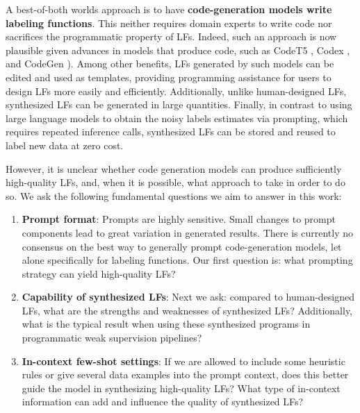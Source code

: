 A best-of-both worlds approach is to have \textbf{code-generation models write labeling functions}. This neither requires domain experts to write code nor sacrifices the programmatic property of LFs. 
%
Indeed, such an approach is now plausible given advances in models that produce code, such as CodeT5 \cite{wang2021codet5}, Codex \cite{chen2021evaluating}, and CodeGen \cite{Nijkamp2022CG}). 
%
Among other benefits, LFs generated by such models can be edited and used as templates, providing programming assistance for users to design LFs more easily and efficiently. 
%
Additionally, unlike human-designed LFs, synthesized LFs can be generated in large quantities. 
%
Finally, in contrast to using large language models to obtain the noisy labels estimates via prompting, which requires repeated inference calls, synthesized LFs can be stored and reused to label new data at zero cost. %


However, it is unclear whether code generation models can produce sufficiently high-quality LFs, and, when it is possible, what approach to take in order to do so. We ask the following fundamental questions we aim to answer in this work:
\begin{enumerate}
    \item \textbf{Prompt format}: Prompts are highly sensitive. Small changes to prompt components lead to great variation in generated results. There is currently no consensus on the best way to generally prompt code-generation models, let alone specifically for labeling functions. Our first question is: what prompting strategy can yield high-quality LFs?
    \item \textbf{Capability of synthesized LFs}: Next we ask: compared to human-designed LFs, what are the strengths and weaknesses of synthesized LFs? Additionally, what is the typical result when using these synthesized programs in programmatic weak supervision pipelines?
    \item \textbf{In-context few-shot settings}: If we are allowed to include some heuristic rules or give several data examples into the prompt context, does this better guide the model in synthesizing high-quality LFs? What type of in-context information can add and influence the quality of synthesized LFs?
\end{enumerate}

